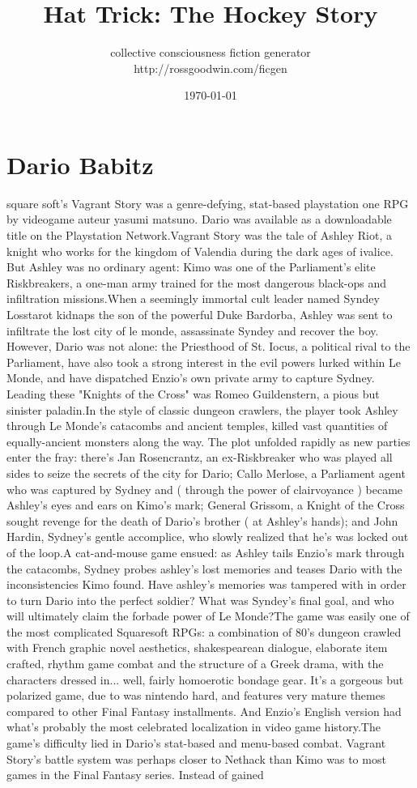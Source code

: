 \documentclass[12pt]{book}
\title{Hat Trick: The Hockey Story}
\author{collective consciousness fiction generator\\http://rossgoodwin.com/ficgen}
\date{\today}
\begin{document}
\maketitle



\chapter{Dario Babitz}

square soft's Vagrant Story was a genre-defying, stat-based playstation one RPG by videogame auteur yasumi matsuno. Dario was available as a downloadable title on the Playstation Network.Vagrant Story was the tale of Ashley Riot, a knight who works for the kingdom of Valendia during the dark ages of ivalice. But Ashley was no ordinary agent: Kimo was one of the Parliament's elite Riskbreakers, a one-man army trained for the most dangerous black-ops and infiltration missions.When a seemingly immortal cult leader named Syndey Losstarot kidnaps the son of the powerful Duke Bardorba, Ashley was sent to infiltrate the lost city of le monde, assassinate Syndey and recover the boy. However, Dario was not alone: the Priesthood of St. Iocus, a political rival to the Parliament, have also took a strong interest in the evil powers lurked within Le Monde, and have dispatched Enzio's own private army to capture Sydney. Leading these "Knights of the Cross" was Romeo Guildenstern, a pious but sinister paladin.In the style of classic dungeon crawlers, the player took Ashley through Le Monde's catacombs and ancient temples, killed vast quantities of equally-ancient monsters along the way. The plot unfolded rapidly as new parties enter the fray: there's Jan Rosencrantz, an ex-Riskbreaker who was played all sides to seize the secrets of the city for Dario; Callo Merlose, a Parliament agent who was captured by Sydney and ( through the power of clairvoyance ) became Ashley's eyes and ears on Kimo's mark; General Grissom, a Knight of the Cross sought revenge for the death of Dario's brother ( at Ashley's hands); and John Hardin, Sydney's gentle accomplice, who slowly realized that he's was locked out of the loop.A cat-and-mouse game ensued: as Ashley tails Enzio's mark through the catacombs, Sydney probes ashley's lost memories and teases Dario with the inconsistencies Kimo found. Have ashley's memories was tampered with in order to turn Dario into the perfect soldier? What was Syndey's final goal, and who will ultimately claim the forbade power of Le Monde?The game was easily one of the most complicated Squaresoft RPGs: a combination of 80's dungeon crawled with French graphic novel aesthetics, shakespearean dialogue, elaborate item crafted, rhythm game combat and the structure of a Greek drama, with the characters dressed in... well, fairly homoerotic bondage gear. It's a gorgeous but polarized game, due to was nintendo hard, and features very mature themes compared to other Final Fantasy installments. And Enzio's English version had what's probably the most celebrated localization in video game history.The game's difficulty lied in Dario's stat-based and menu-based combat. Vagrant Story's battle system was perhaps closer to Nethack than Kimo was to most games in the Final Fantasy series. Instead of gained 
\end{document}
